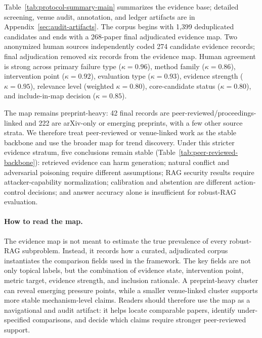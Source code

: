 \documentclass[11pt]{article}
\begin{document}



Table~\ref{tab:protocol-summary-main} summarizes the evidence base; detailed screening, venue audit, annotation, and ledger artifacts are in Appendix~\ref{sec:audit-artifacts}. The corpus begins with 1,399 deduplicated candidates and ends with a 268-paper final adjudicated evidence map. Two anonymized human sources independently coded 274 candidate evidence records; final adjudication removed six records from the evidence map. Human agreement is strong across primary failure type ($\kappa=0.96$), method family ($\kappa=0.86$), intervention point ($\kappa=0.92$), evaluation type ($\kappa=0.93$), evidence strength ($\kappa=0.95$), relevance level (weighted $\kappa=0.80$), core-candidate status ($\kappa=0.80$), and include-in-map decision ($\kappa=0.85$).

The map remains preprint-heavy: 42 final records are peer-reviewed/proceedings-linked and 222 are arXiv-only or emerging preprints, with a few other source strata. We therefore treat peer-reviewed or venue-linked work as the stable backbone and use the broader map for trend discovery. Under this stricter evidence stratum, five conclusions remain stable (Table~\ref{tab:peer-reviewed-backbone}): retrieved evidence can harm generation; natural conflict and adversarial poisoning require different assumptions; RAG security results require attacker-capability normalization; calibration and abstention are different action-control decisions; and answer accuracy alone is insufficient for robust-RAG evaluation.

\paragraph{How to read the map.}
The evidence map is not meant to estimate the true prevalence of every robust-RAG subproblem. Instead, it records how a curated, adjudicated corpus instantiates the comparison fields used in the framework. The key fields are not only topical labels, but the combination of evidence state, intervention point, metric target, evidence strength, and inclusion rationale. A preprint-heavy cluster can reveal emerging pressure points, while a smaller venue-linked cluster supports more stable mechanism-level claims. Readers should therefore use the map as a navigational and audit artifact: it helps locate comparable papers, identify under-specified comparisons, and decide which claims require stronger peer-reviewed support.
\end{document}
